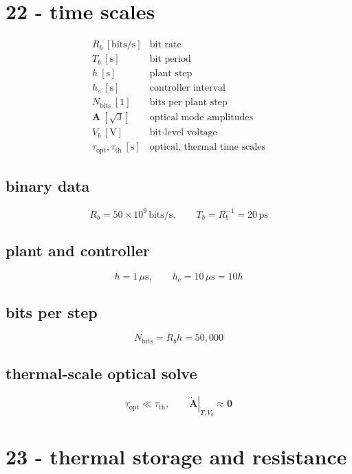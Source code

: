 \clearpage
\section*{22 - time scales}

\[
\begin{array}{ll}R_b\ [\mathrm{bits/s}]&\text{bit rate}\\[0.6em]T_b\ [\mathrm s]&\text{bit period}\\[0.6em]h\ [\mathrm s]&\text{plant step}\\[0.6em]h_c\ [\mathrm s]&\text{controller interval}\\[0.6em]N_{\mathrm{bits}}\ [1]&\text{bits per plant step}\\[0.6em]\mathbf A\ [\sqrt{\mathrm J}]&\text{optical mode amplitudes}\\[0.6em]V_b\ [\mathrm V]&\text{bit-level voltage}\\[0.6em]\tau_{\mathrm{opt}},\tau_{\mathrm{th}}\ [\mathrm s]&\text{optical, thermal time scales}\end{array}
\]

\subsection*{binary data}
\[
\displaystyle R_b=50\times10^9\,\mathrm{bits/s},\qquad T_b=R_b^{-1}=20\,\mathrm{ps}
\]

\subsection*{plant and controller}
\[
\displaystyle h=1\,\mu\mathrm s,\qquad h_c=10\,\mu\mathrm s=10h
\]

\subsection*{bits per step}
\[
\displaystyle N_{\mathrm{bits}}=R_bh=50{,}000
\]

\subsection*{thermal-scale optical solve}
\[
\displaystyle \tau_{\mathrm{opt}}\ll\tau_{\mathrm{th}},\qquad\left.\dot{\mathbf A}\right|_{T,V_b}\approx\mathbf0
\]

\clearpage
\section*{23 - thermal storage and resistance}


